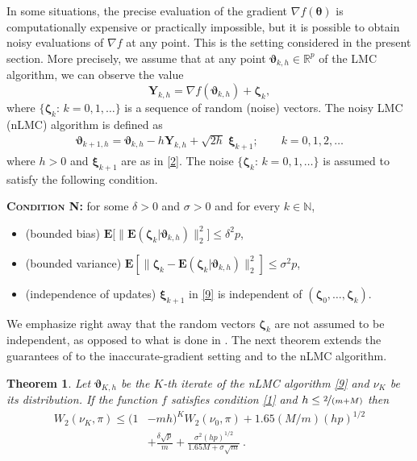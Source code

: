 \documentclass[aoap,preprint,reqno,a4paper]{imsart} %
\newcommand{\RR}{\mathbb{R}}
\newcommand{\NN}{\mathbb{N}}
\newcommand{\bzeta}{\boldsymbol{\zeta}}
\newcommand{\btheta}{\boldsymbol{\theta}}
\newcommand{\bvartheta}{\boldsymbol{\vartheta}}
\newcommand{\bxi}{\boldsymbol{\xi}}
\newcommand{\bfE}{\mathbf E}
\newcommand{\bY}{\boldsymbol Y}
\newtheorem{theorem}{Theorem}
\begin{document}
In some situations, the precise evaluation of the gradient $\nabla f(\btheta)$
is computationally expensive or practically impossible, but it is possible to
obtain noisy evaluations of $\nabla f$ at any point. This is the setting considered
in the present section. More precisely, we assume that at any point $\bvartheta_{k,h}\in\RR^p$
of the LMC algorithm, we can observe the value
\begin{equation}
\bY_{k,h}  = \nabla f(\bvartheta_{k,h}) + \bzeta_{k},
\end{equation}
where $\{\bzeta_{k}:\,k=0,1,\ldots\}$ is a sequence of random (noise) vectors.
The noisy LMC (nLMC) algorithm is defined as
\begin{align}\label{9}
\bvartheta_{k+1,h} = \bvartheta_{k,h} - h \bY_{k,h}+ \sqrt{2h}\;\bxi_{k+1};\qquad k=0,1,2,\ldots
\end{align}
where $h>0$ and $\bxi_{k+1}$ are as in \eqref{2}. The noise $\{\bzeta_{k}:\,k=0,1,\ldots\}$ is assumed to satisfy the following condition.

\textbf{\textsc{Condition N:}} for some $\delta>0$ and $\sigma>0$ and for every $k\in\NN$,
\vspace{-4pt}
\begin{itemize}\itemsep=3pt
\item (bounded bias) $\bfE\big[\big\|\bfE(\bzeta_{k}|\bvartheta_{k,h})\big\|_2^2\big] \le \delta^2p$,
\item (bounded variance) $\bfE[\|\bzeta_{k}-\bfE(\bzeta_{k}|\bvartheta_{k,h})\|_2^2]\le \sigma^2 p$,
\item (independence of updates) $\bxi_{k+1}$ in \eqref{9} is independent of $(\bzeta_0,\ldots,\bzeta_{k})$.
\end{itemize}

We emphasize right away that the random vectors $\bzeta_k$ are not assumed
to be independent, as opposed to what is done in \citep{DalalyanColt}.
The next theorem extends the guarantees
of  to the inaccurate-gradient setting and to the nLMC algorithm.

\begin{theorem}\label{thTwo}
Let $\bvartheta_{K,h}$ be the $K$-th iterate of the nLMC algorithm \eqref{9} and
$\nu_K$ be its distribution. If the function $f$ satisfies condition \eqref{1}
and $h\le \nicefrac2{(m+M)}$ then
\begin{align}\label{A}
W_2(\nu_K, \pi) \le (1&-mh)^{K} W_2(\nu_0,\pi) + 1.65(M/m)(hp)^{1/2} \\
		&+ \frac{\delta\sqrt{p}}{m} + \frac{\sigma^2 (hp)^{1/2} }{1.65M + \sigma \sqrt{m}}\ .
\end{align}
\end{theorem}
\end{document}
